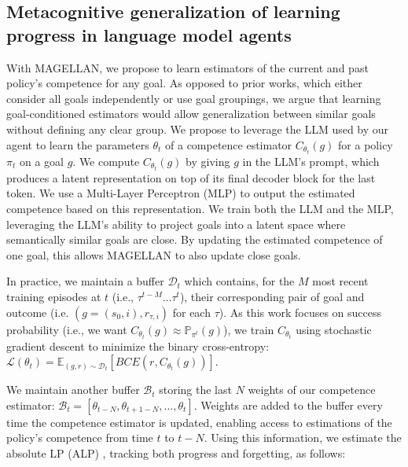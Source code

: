 \documentclass{article}
\begin{document}
\subsection{Metacognitive generalization of learning progress in language model agents}
With MAGELLAN, we propose to learn estimators of the current and past policy's competence for any goal. As opposed to prior works, which either consider all goals independently or use goal groupings, we argue that learning goal-conditioned estimators would allow generalization between similar goals without defining any clear group. We propose to leverage the LLM used by our agent to learn the parameters $\theta_t$ of a competence estimator $C_{\theta_t}(g)$ for a policy $\pi_t$ on a goal $g$. We compute $C_{\theta_t}(g)$ by giving $g$ in the LLM's prompt, which produces a latent representation on top of its final decoder block for the last token. We use a Multi-Layer Perceptron (MLP) to output the estimated competence based on this representation. We train both the LLM and the MLP, leveraging the LLM's ability to project goals into a latent space where semantically similar goals are close. By updating the estimated competence of one goal, this allows MAGELLAN to also update close goals. 

In practice, we maintain a buffer $\mathcal{D}_t$ which contains, for the $M$ most recent training episodes at $t$ (i.e., $\tau^{t-M} \ldots \tau^t$), their corresponding pair of goal and outcome (i.e. $\left(g=(s_0,i), r_{\tau,i}\right)$ for each $\tau$).  
As this work focuses on success probability (i.e., we want $C_{\theta_t}(g) \approx \mathbb{P}_{\pi^t}(g)$), we train $C_{\theta_t}$ using stochastic gradient descent to minimize the binary cross-entropy: $\mathcal{L}(\theta_t) = \mathbb{E}_{(g, r) \sim \mathcal{D}_t} \left[ BCE(r %
, C_{\theta_t}(g)) \right]$.

We maintain another buffer $\mathcal{B}_t$ storing the last $N$ weights of our competence estimator: $\mathcal{B}_t = \left[ \theta_{t-N}, \theta_{t+1-N}, \dots, \theta_t \right]$. Weights are added to the buffer every time the competence estimator is updated, enabling access to estimations of the policy's competence from time $t$ to $t-N$. Using this information, we estimate the absolute LP (ALP) \citet{baranes_active_2013,kanitscheider_multi-task_2021}, tracking both progress and forgetting, as follows:
\end{document}
